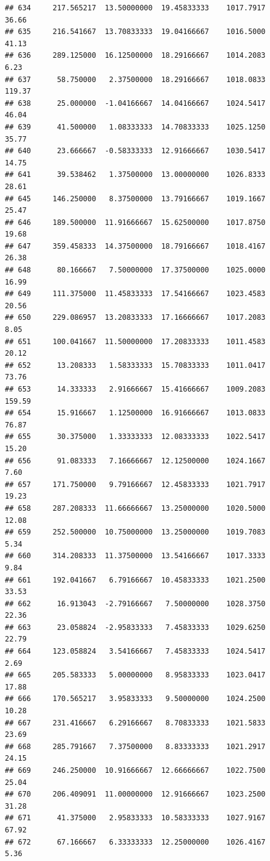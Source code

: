 \documentclass[
]{article}
\begin{document}
\begin{verbatim}
## 634     217.565217  13.50000000  19.45833333    1017.7917       36.66
## 635     216.541667  13.70833333  19.04166667    1016.5000       41.13
## 636     289.125000  16.12500000  18.29166667    1014.2083        6.23
## 637      58.750000   2.37500000  18.29166667    1018.0833      119.37
## 638      25.000000  -1.04166667  14.04166667    1024.5417       46.04
## 639      41.500000   1.08333333  14.70833333    1025.1250       35.77
## 640      23.666667  -0.58333333  12.91666667    1030.5417       14.75
## 641      39.538462   1.37500000  13.00000000    1026.8333       28.61
## 645     146.250000   8.37500000  13.79166667    1019.1667       25.47
## 646     189.500000  11.91666667  15.62500000    1017.8750       19.68
## 647     359.458333  14.37500000  18.79166667    1018.4167       26.38
## 648      80.166667   7.50000000  17.37500000    1025.0000       16.99
## 649     111.375000  11.45833333  17.54166667    1023.4583       20.56
## 650     229.086957  13.20833333  17.16666667    1017.2083        8.05
## 651     100.041667  11.50000000  17.20833333    1011.4583       20.12
## 652      13.208333   1.58333333  15.70833333    1011.0417       73.76
## 653      14.333333   2.91666667  15.41666667    1009.2083      159.59
## 654      15.916667   1.12500000  16.91666667    1013.0833       76.87
## 655      30.375000   1.33333333  12.08333333    1022.5417       15.20
## 656      91.083333   7.16666667  12.12500000    1024.1667        7.60
## 657     171.750000   9.79166667  12.45833333    1021.7917       19.23
## 658     287.208333  11.66666667  13.25000000    1020.5000       12.08
## 659     252.500000  10.75000000  13.25000000    1019.7083        5.34
## 660     314.208333  11.37500000  13.54166667    1017.3333        9.84
## 661     192.041667   6.79166667  10.45833333    1021.2500       33.53
## 662      16.913043  -2.79166667   7.50000000    1028.3750       22.36
## 663      23.058824  -2.95833333   7.45833333    1029.6250       22.79
## 664     123.058824   3.54166667   7.45833333    1024.5417        2.69
## 665     205.583333   5.00000000   8.95833333    1023.0417       17.88
## 666     170.565217   3.95833333   9.50000000    1024.2500       10.28
## 667     231.416667   6.29166667   8.70833333    1021.5833       23.69
## 668     285.791667   7.37500000   8.83333333    1021.2917       24.15
## 669     246.250000  10.91666667  12.66666667    1022.7500       25.04
## 670     206.409091  11.00000000  12.91666667    1023.2500       31.28
## 671      41.375000   2.95833333  10.58333333    1027.9167       67.92
## 672      67.166667   6.33333333  12.25000000    1026.4167        5.36

\end{verbatim}
\end{document}
